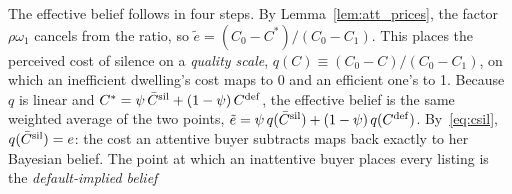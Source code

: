 The effective belief follows in four steps. By Lemma~\ref{lem:att_prices}, the factor $\rho\omega_1$ cancels from the ratio, so $\tilde e=(C_0-C^*)/(C_0-C_1)$. This places the perceived cost of silence on a \emph{quality scale}, $q(C)\equiv(C_0-C)/(C_0-C_1)$, on which an inefficient dwelling's cost maps to 0 and an efficient one's to 1. Because $q$ is linear and $C^*=\psi\,\bar C^{\rm sil}+(1-\psi)\,C^{\rm def}$, the effective belief is the same weighted average of the two points, $\tilde e=\psi\,q(\bar C^{\rm sil})+(1-\psi)\,q(C^{\rm def})$. By~\eqref{eq:csil}, $q(\bar C^{\rm sil})=e$: the cost an attentive buyer subtracts maps back exactly to her Bayesian belief. The point at which an inattentive buyer places every listing is the \emph{default-implied belief}
